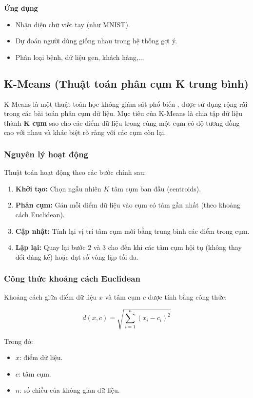 \textbf{Ứng dụng}

\begin{itemize}
    \item Nhận diện chữ viết tay (như MNIST).
    \item Dự đoán người dùng giống nhau trong hệ thống gợi ý.
    \item Phân loại bệnh, dữ liệu gen, khách hàng,...
\end{itemize}

\subsection {K-Means (Thuật toán phân cụm K trung bình)}
\label{label:kmean}
K-Means là một thuật toán học không giám sát phổ biến \cite{bishop2006pattern}, được sử dụng rộng rãi trong các bài toán phân cụm dữ liệu. Mục tiêu của K-Means là chia tập dữ liệu thành \textbf{K cụm} sao cho các điểm dữ liệu trong cùng một cụm có độ tương đồng cao với nhau và khác biệt rõ ràng với các cụm còn lại.

\subsubsection*{Nguyên lý hoạt động}

Thuật toán hoạt động theo các bước chính sau:

\begin{enumerate}
    \item \textbf{Khởi tạo:} Chọn ngẫu nhiên $K$ tâm cụm ban đầu (centroids).
    \item \textbf{Phân cụm:} Gán mỗi điểm dữ liệu vào cụm có tâm gần nhất (theo khoảng cách Euclidean).
    \item \textbf{Cập nhật:} Tính lại vị trí tâm cụm mới bằng trung bình các điểm trong cụm.
    \item \textbf{Lặp lại:} Quay lại bước 2 và 3 cho đến khi các tâm cụm hội tụ (không thay đổi đáng kể) hoặc đạt số vòng lặp tối đa.
\end{enumerate}

\subsubsection*{Công thức khoảng cách Euclidean}

Khoảng cách giữa điểm dữ liệu $x$ và tâm cụm $c$ được tính bằng công thức:

\[
d(x, c) = \sqrt{\sum_{i=1}^{n} (x_i - c_i)^2}
\]

Trong đó:
\begin{itemize}
    \item $x$: điểm dữ liệu.
    \item $c$: tâm cụm.
    \item $n$: số chiều của không gian dữ liệu.
\end{itemize}

